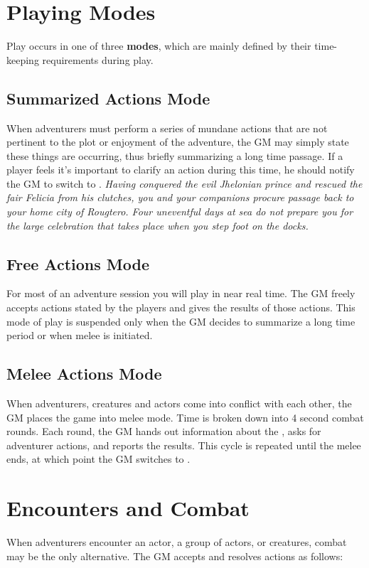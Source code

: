 \begin{multicols*}{2}
\section{Playing Modes}
Play occurs in one of three \textbf{modes}, which are mainly defined by their time-keeping requirements during play.
\subsection{Summarized Actions Mode}
When adventurers must perform a series of mundane actions that are not pertinent to the plot or  enjoyment of the adventure, the GM may simply state these things are occurring, thus briefly summarizing a long time passage. If a player feels it's important to clarify an action during this time, he should notify the GM to switch to .
\textit{Having conquered the evil Jhelonian prince and rescued the fair Felicia from his clutches, you and your companions procure passage back to your home city of Rougtero. Four uneventful days at sea do not prepare you for the large celebration that takes place when you step foot on the docks.}
\subsection{Free Actions Mode}
For most of an adventure session you will play in near real time. The GM freely accepts actions stated by the players and gives the results of those actions. This mode of play is suspended only when the GM decides to summarize a long time period or when melee is initiated.
\subsection{Melee Actions Mode}
When adventurers, creatures and actors come into conflict with each other, the GM places the game into melee mode. Time is broken down into 4 second combat rounds. Each round, the GM hands out information about the , asks for adventurer actions, and reports the results. This cycle is repeated until the melee ends, at which point the GM switches to .
\section{Encounters and Combat}
\label{encounter}
When adventurers encounter an actor, a group of actors, or creatures, combat may be the only alternative. The GM accepts and resolves  actions as follows:

\end{multicols*}
